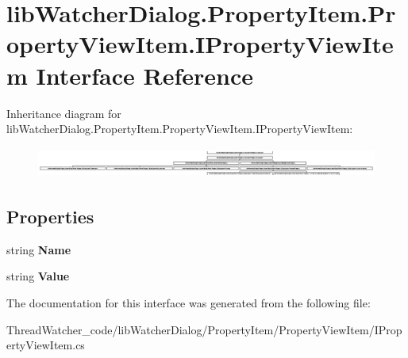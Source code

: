 \hypertarget{interfacelib_watcher_dialog_1_1_property_item_1_1_property_view_item_1_1_i_property_view_item}{\section{lib\+Watcher\+Dialog.\+Property\+Item.\+Property\+View\+Item.\+I\+Property\+View\+Item Interface Reference}
\label{interfacelib_watcher_dialog_1_1_property_item_1_1_property_view_item_1_1_i_property_view_item}
}
Inheritance diagram for lib\+Watcher\+Dialog.\+Property\+Item.\+Property\+View\+Item.\+I\+Property\+View\+Item\+:\begin{figure}[H]
\begin{center}
\leavevmode
\includegraphics[height=1.012658cm]{interfacelib_watcher_dialog_1_1_property_item_1_1_property_view_item_1_1_i_property_view_item}
\end{center}
\end{figure}
\subsection*{Properties}
\begin{DoxyCompactItemize}
\item 
\hypertarget{interfacelib_watcher_dialog_1_1_property_item_1_1_property_view_item_1_1_i_property_view_item_ad869eb0c18c1c2b3c12daed3a99466bd}{string {\bfseries Name}}\label{interfacelib_watcher_dialog_1_1_property_item_1_1_property_view_item_1_1_i_property_view_item_ad869eb0c18c1c2b3c12daed3a99466bd}

\item 
\hypertarget{interfacelib_watcher_dialog_1_1_property_item_1_1_property_view_item_1_1_i_property_view_item_aa523723604540c2ef11c2fcf5aa4331e}{string {\bfseries Value}}\label{interfacelib_watcher_dialog_1_1_property_item_1_1_property_view_item_1_1_i_property_view_item_aa523723604540c2ef11c2fcf5aa4331e}

\end{DoxyCompactItemize}


The documentation for this interface was generated from the following file\+:\begin{DoxyCompactItemize}
\item 
Thread\+Watcher\+\_\+code/lib\+Watcher\+Dialog/\+Property\+Item/\+Property\+View\+Item/I\+Property\+View\+Item.\+cs\end{DoxyCompactItemize}
